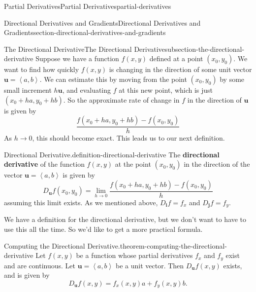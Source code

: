 \documentclass[oneside,10pt,]{book}
\newcommand{\terminology}[1]{\textbf{#1}}
\numberwithin{equation}{section}
\newcommand{\vv}[1]{\mathbf{#1}}
\newcommand{\dotprod}[1]{\left\langle #1 \right\rangle}
\begin{document}
\begin{chapterptx}{Partial Derivatives}{}{Partial Derivatives}{}{}{partial-derivatives}
\begin{sectionptx}{Directional Derivatives and Gradients}{}{Directional Derivatives and Gradients}{}{}{section-directional-derivatives-and-gradients}
\begin{introduction}{}
\end{introduction}%
%
%
\typeout{************************************************}
\typeout{************************************************}
%
\begin{subsectionptx}{The Directional Derivative}{}{The Directional Derivative}{}{}{subsection-the-directional-derivative}
\hypertarget{p-1399}{}%
Suppose we have a function \(f(x,y)\) defined at a point \((x_{0},y_{0})\). We want to find how quickly \(f(x,y)\) is changing in the direction of some unit vector \(\vv{u} = \dotprod{a,b}\). We can estimate this by moving from the point \((x_{0},y_{0})\) by some small increment \(h\vv{u}\), and evaluating \(f\) at this new point, which is just \((x_{0} + ha, y_{0} + hb)\). So the approximate rate of change in \(f\) in the direction of \(\vv{u}\) is given by%
\begin{equation*}
\frac{f(x_{0}+ha, y_{0} + hb) - f(x_{0},y_{0})}{h}
\end{equation*}
As \(h\to0\), this should become exact. This leads us to our next definition.%
\begin{definition}{Directional Derivative.}{definition-directional-derivative}%
\hypertarget{p-1400}{}%
The \terminology{directional derivative} of the function \(f(x,y)\) at the point \((x_{0},y_{0})\) in the direction of the vector \(\vv{u} = \dotprod{a,b}\) is given by%
\begin{equation*}
D_{\vv{u}}f(x_{0},y_{0}) = \lim_{h\to0}\frac{f(x_{0}+ha, y_{0} + hb) - f(x_{0},y_{0})}{h}
\end{equation*}
assuming this limit exists. As we mentioned above, \(D_{\vv{i}}f = f_{x}\) and \(D_{\vv{j}}f = f_{y}\).%
\end{definition}
\hypertarget{p-1401}{}%
We have a definition for the directional derivative, but we don't want to have to use this all the time. So we'd like to get a more practical formula.%
\begin{theorem}{Computing the Directional Derivative.}{}{theorem-computing-the-directional-derivative}%
\hypertarget{p-1402}{}%
Let \(f(x,y)\) be a function whose partial derivatives \(f_{x}\) and \(f_{y}\) exist and are continuous. Let \(\vv{u} = \dotprod{a,b}\) be a unit vector. Then \(D_{\vv{u}}f(x,y)\) exists, and is given by%
\begin{equation*}
D_{\vv{u}}f(x,y) = f_{x}(x,y)a + f_{y}(x,y)b.
\end{equation*}

\end{theorem}
\end{subsectionptx}
\end{sectionptx}
\end{chapterptx}
\end{document}
